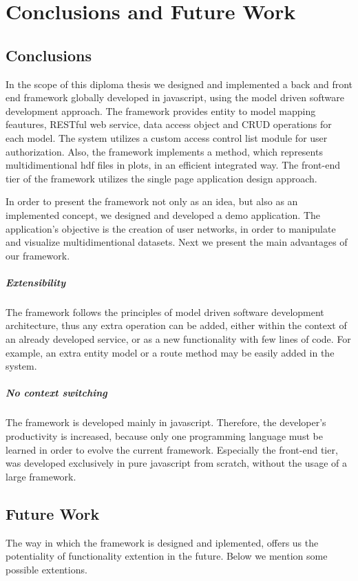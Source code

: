 \chapter{Conclusions and Future Work}
\label{chapter7_cf}
\section{Conclusions}
In the scope of this diploma thesis we designed and implemented a back and front end framework globally developed in javascript, using the model driven software development approach. The framework provides entity to model mapping feautures, RESTful web service, data access object and CRUD operations for each model. The system utilizes a custom access control list module for user authorization. Also, the framework implements a method, which represents multidimentional hdf files in plots, in an efficient integrated way. The front-end tier of the framework utilizes the single page application design approach. \par 
	In order to present the framework not only as an idea, but also as an implemented concept, we designed and developed a demo application. The application's objective is the creation of user networks, in order to manipulate and visualize multidimentional datasets. Next we present the main advantages of our framework.

\paragraph{Extensibility} The framework follows the principles of model driven software development architecture, thus any extra operation can be added, either within the context of an already developed service, or as a new functionality with few lines of code. For example, an extra entity model or a route method may be easily added in the system.
	

\paragraph{No context switching} The framework is developed mainly in javascript. Therefore, the developer's productivity is increased, because only one programming language must be learned in order to evolve the current framework. Especially the front-end tier, was developed exclusively in pure javascript from scratch, without the usage of a large framework.


\section{Future Work}
The way in which the framework is designed and iplemented, offers us the potentiality of functionality extention in the future. Below we mention some possible extentions.

